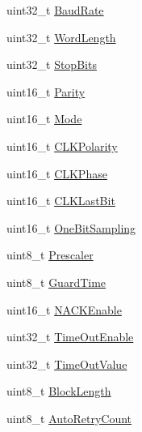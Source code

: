 \begin{DoxyCompactItemize}
\item 
uint32\+\_\+t \hyperlink{struct_s_m_a_r_t_c_a_r_d___init_type_def_aaad609733f3fd8146c8745e953a91b2a}{Baud\+Rate}
\item 
uint32\+\_\+t \hyperlink{struct_s_m_a_r_t_c_a_r_d___init_type_def_ae5e60b9a021fe0009588fc86c7584a5a}{Word\+Length}
\item 
uint32\+\_\+t \hyperlink{struct_s_m_a_r_t_c_a_r_d___init_type_def_a8394ba239444e3e5fe1ada1c37cb1019}{Stop\+Bits}
\item 
uint16\+\_\+t \hyperlink{struct_s_m_a_r_t_c_a_r_d___init_type_def_ab9ca95a28592c8639b87be21d8ec2026}{Parity}
\item 
uint16\+\_\+t \hyperlink{struct_s_m_a_r_t_c_a_r_d___init_type_def_aabdbacb3ad2d5c4b4594fda17777f292}{Mode}
\item 
uint16\+\_\+t \hyperlink{struct_s_m_a_r_t_c_a_r_d___init_type_def_a4ffca0b913184369dd2f21e2a9dcad75}{C\+L\+K\+Polarity}
\item 
uint16\+\_\+t \hyperlink{struct_s_m_a_r_t_c_a_r_d___init_type_def_a08eaff81789b11c5af048347c68d6eb4}{C\+L\+K\+Phase}
\item 
uint16\+\_\+t \hyperlink{struct_s_m_a_r_t_c_a_r_d___init_type_def_a37ab9d1c5ce9ffc1ad69e0ee74ae9fd6}{C\+L\+K\+Last\+Bit}
\item 
uint16\+\_\+t \hyperlink{struct_s_m_a_r_t_c_a_r_d___init_type_def_aa9e1e2730d3764f6bcc994a41f30c28c}{One\+Bit\+Sampling}
\item 
uint8\+\_\+t \hyperlink{struct_s_m_a_r_t_c_a_r_d___init_type_def_a5c9d1e760b400d2502c03b0391606f90}{Prescaler}
\item 
uint8\+\_\+t \hyperlink{struct_s_m_a_r_t_c_a_r_d___init_type_def_af4d18b6718b05eba09981764ec1fc466}{Guard\+Time}
\item 
uint16\+\_\+t \hyperlink{struct_s_m_a_r_t_c_a_r_d___init_type_def_a4b40e866ffda1e4a75cd2c6b8fe3063e}{N\+A\+C\+K\+Enable}
\item 
uint32\+\_\+t \hyperlink{struct_s_m_a_r_t_c_a_r_d___init_type_def_a2f228719b83d2c8b7795c08f7f6e1d82}{Time\+Out\+Enable}
\item 
uint32\+\_\+t \hyperlink{struct_s_m_a_r_t_c_a_r_d___init_type_def_addf8da5ef1eb6f989da4d85e43901c8b}{Time\+Out\+Value}
\item 
uint8\+\_\+t \hyperlink{struct_s_m_a_r_t_c_a_r_d___init_type_def_a6a7dfaac82722a408c623a25c47edd03}{Block\+Length}
\item 
uint8\+\_\+t \hyperlink{struct_s_m_a_r_t_c_a_r_d___init_type_def_a92419157047aa30996c86f921042656e}{Auto\+Retry\+Count}
\end{DoxyCompactItemize}



